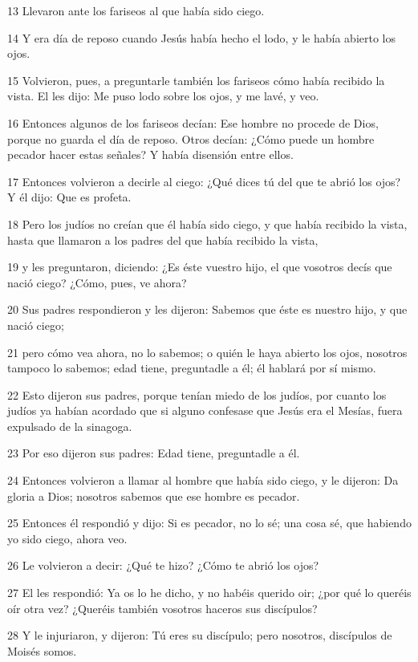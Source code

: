 \par 13 Llevaron ante los fariseos al que había sido ciego.
\par 14 Y era día de reposo cuando Jesús había hecho el lodo, y le había abierto los ojos.
\par 15 Volvieron, pues, a preguntarle también los fariseos cómo había recibido la vista. El les dijo: Me puso lodo sobre los ojos, y me lavé, y veo.
\par 16 Entonces algunos de los fariseos decían: Ese hombre no procede de Dios, porque no guarda el día de reposo. Otros decían: ¿Cómo puede un hombre pecador hacer estas señales? Y había disensión entre ellos.
\par 17 Entonces volvieron a decirle al ciego: ¿Qué dices tú del que te abrió los ojos? Y él dijo: Que es profeta.
\par 18 Pero los judíos no creían que él había sido ciego, y que había recibido la vista, hasta que llamaron a los padres del que había recibido la vista,
\par 19 y les preguntaron, diciendo: ¿Es éste vuestro hijo, el que vosotros decís que nació ciego? ¿Cómo, pues, ve ahora?
\par 20 Sus padres respondieron y les dijeron: Sabemos que éste es nuestro hijo, y que nació ciego;
\par 21 pero cómo vea ahora, no lo sabemos; o quién le haya abierto los ojos, nosotros tampoco lo sabemos; edad tiene, preguntadle a él; él hablará por sí mismo.
\par 22 Esto dijeron sus padres, porque tenían miedo de los judíos, por cuanto los judíos ya habían acordado que si alguno confesase que Jesús era el Mesías, fuera expulsado de la sinagoga.
\par 23 Por eso dijeron sus padres: Edad tiene, preguntadle a él.
\par 24 Entonces volvieron a llamar al hombre que había sido ciego, y le dijeron: Da gloria a Dios; nosotros sabemos que ese hombre es pecador.
\par 25 Entonces él respondió y dijo: Si es pecador, no lo sé; una cosa sé, que habiendo yo sido ciego, ahora veo.
\par 26 Le volvieron a decir: ¿Qué te hizo? ¿Cómo te abrió los ojos?
\par 27 El les respondió: Ya os lo he dicho, y no habéis querido oir; ¿por qué lo queréis oír otra vez? ¿Queréis también vosotros haceros sus discípulos?
\par 28 Y le injuriaron, y dijeron: Tú eres su discípulo; pero nosotros, discípulos de Moisés somos.
